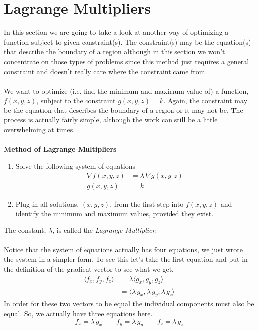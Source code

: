 \documentclass[10pt,reqno]{book}
\theoremstyle{definition}
\begin{document}
	\section{Lagrange Multipliers}
	
	In this section we are going to take a look at another way of optimizing a function subject to given constraint(s). The constraint(s) may be the equation(s) that describe the boundary of a region although in this section we won't concentrate on those types of problems since this method just requires a general constraint and doesn't really care where the constraint came from.\\ \\
	We want to optimize (i.e. find the minimum and maximum value of) a function, $ f(x,y,z) $, subject to the constraint $ g(x,y,z) = k $. Again, the constraint may be the equation that describes the boundary of a region or it may not be. The process is actually fairly simple, although the work can still be a little overwhelming at times.\\ \\
	\textbf{Method of Lagrange Multipliers}
	\begin{enumerate}
		\item Solve the following system of equations
		\begin{align*}
			\nabla f(x,y,z) &= \lambda \,  \nabla g(x,y,z)\\
			g(x,y,z) &= k
		\end{align*}
		\item Plug in all solutions, $ (x,y,z) $, from the first step into $ f(x,y,z) $ and identify the minimum and maximum values, provided they exist.
	\end{enumerate}
	The constant, $ \lambda $, is called the \textit{Lagrange Multiplier}.\\ \\
	Notice that the system of equations actually has four equations, we just wrote the system in a simpler form. To see this let's take the first equation and put in the definition of the gradient vector to see what we get.
	\begin{align*}
		\langle f_x,f_y,f_z \rangle &= \lambda \langle g_x,g_y,g_z \rangle\\
		&= \langle \lambda\,g_x,\lambda\,g_y,\lambda\,g_z \rangle 
	\end{align*}
	In order for these two vectors to be equal the individual components must also be equal. So, we actually have three equations here.
	\[ f_x = \lambda \, g_x \qquad f_y = \lambda \, g_y \qquad f_z = \lambda \, g_z \]
\end{document}
